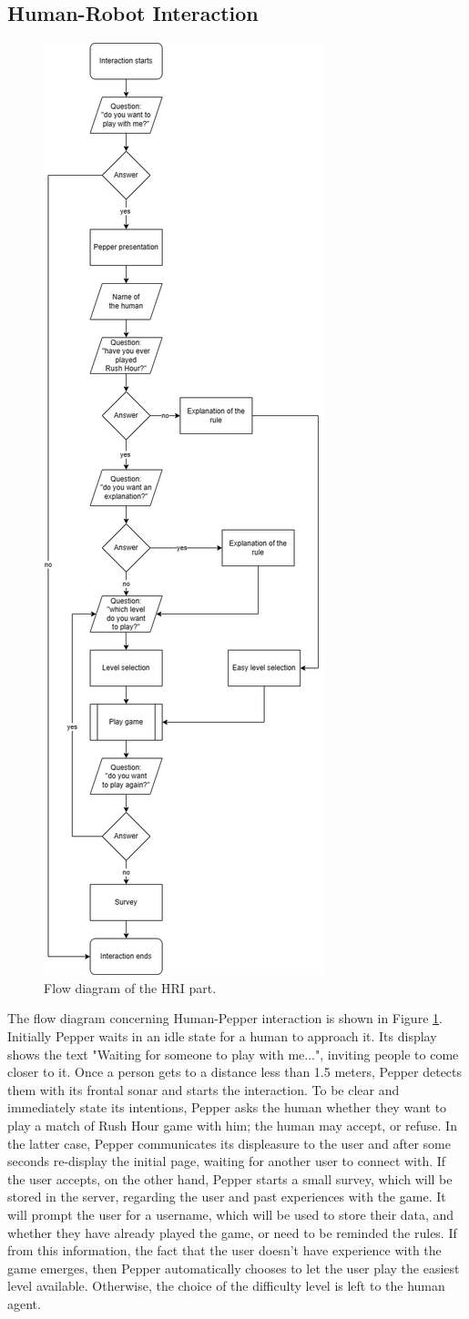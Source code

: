 \documentclass{article}
\begin{document}
\subsection{Human-Robot Interaction}
\begin{figure}[H]
    \centering
    \includegraphics[width=.36\textwidth]{images/flow_diagram.png}
    \caption{Flow diagram of the HRI part.}
    \label{fig:flow}
\end{figure}
\indent The flow diagram concerning Human-Pepper interaction is shown in Figure \ref{fig:flow}. Initially Pepper waits in an idle state for a human to approach it. Its display shows the text "Waiting for someone to play with me...", inviting people to come closer to it. Once a person gets to a distance less than 1.5 meters, Pepper detects them with its frontal sonar and starts the interaction. To be clear and immediately state its intentions, Pepper asks the human whether they want to play a match of Rush Hour game with him; the human may accept, or refuse. In the latter case, Pepper communicates its displeasure to the user and after some seconds re-display the initial page, waiting for another user to connect with. If the user accepts, on the other hand, Pepper starts a small survey, which will be stored in the server, regarding the user and past experiences with the game. It will prompt the user for a username, which will be used to store their data, and whether they have already played the game, or need to be reminded the rules. If from this information, the fact that the user doesn't have experience with the game emerges, then Pepper automatically chooses to let the user play the easiest level available. Otherwise, the choice of the difficulty level is left to the human agent.
\end{document}
